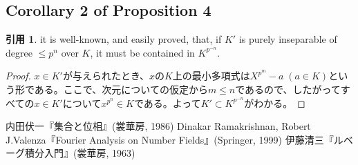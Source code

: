 \documentclass[12pt]{jsarticle}%
\renewenvironment{leftbar}{%
  \renewcommand\FrameCommand{\vrule width 1pt \hspace{10pt}}%
  \MakeFramed {\advance\hsize-\width \FrameRestore}}%
 {\endMakeFramed}
\newcommand{\barquo}[1]{\begin{leftbar} \begin{quo} #1 \end{quo} \end{leftbar}}%
\newcommand{\bfsubsection}[1]{\subsection*{\textbf{#1}}}
\theoremstyle{definition}%
\newtheorem*{quo}{引用}
\begin{document}
\bfsubsection{Corollary 2 of Proposition 4}
\barquo{
it is well-known, and easily proved, that, if $K'$ is purely inseparable of degree $\leq p^n$ over $K$, it must be contained in $K^{p^{-n}}$.
}
\begin{proof}
  $x \in K'$が与えられたとき、$x$の$K$上の最小多項式は$X^{p^m} - a \; (a \in K)$という形である。ここで、次元についての仮定から$m \leq n$であるので、したがってすべての$x \in K'$について$x^{p^n} \in K$である。よって$K' \subset K^{p^{-n}}$がわかる。
\end{proof}



\newpage
\begin{thebibliography}{1}%
   内田伏一『集合と位相』(裳華房, 1986)
   Dinakar Ramakrishnan, Robert J.Valenza『Fourier Analysis on Number Fields』(Springer, 1999)
   伊藤清三『ルベーグ積分入門』(裳華房, 1963)
\end{thebibliography}
\end{document}
